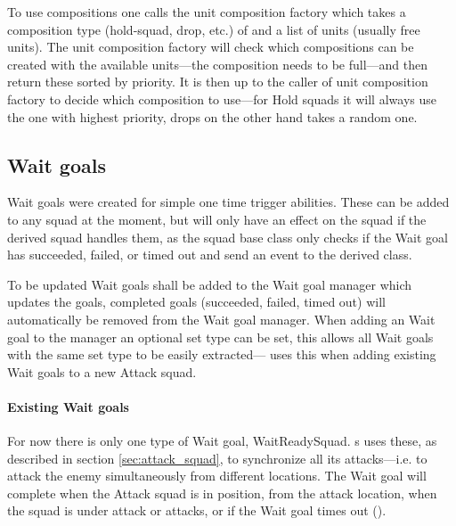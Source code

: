 To use compositions one calls the unit composition factory which takes a composition type (hold-squad, drop, etc.) of and a list of units (usually free units). The unit composition factory will check which compositions can be created with the available units—the composition needs to be full—and then return these sorted by priority. It is then up to the caller of unit composition factory to decide which composition to use—for Hold squads it will always use the one with highest priority, drops on the other hand takes a random one.

\subsection{Wait goals}
\label{sec:wait_goals}
Wait goals were created for simple one time trigger abilities. These can be added to any squad at the moment, but will only have an effect on the squad if the derived squad handles them, as the squad base class only checks if the Wait goal has succeeded, failed, or timed out and send an event to the derived class.

To be updated Wait goals shall be added to the Wait goal manager which updates the goals, completed goals (succeeded, failed, timed out) will automatically be removed from the Wait goal manager. When adding an Wait goal to the manager an optional set type can be set, this allows all Wait goals with the same set type to be easily extracted— uses this when adding existing Wait goals to a new Attack squad.

\paragraph{Existing Wait goals}
For now there is only one type of Wait goal, WaitReadySquad. s uses these, as described in section \ref{sec:attack_squad}, to synchronize all its attacks—i.e. to attack the enemy simultaneously from different locations. The Wait goal will complete when the Attack squad is in position, \squadAttackWaitingPositionDistanceFromGoal from the attack location, when the squad is under attack or attacks, or if the Wait goal times out (\attackCoordinatorWaitGoalTimeout).
